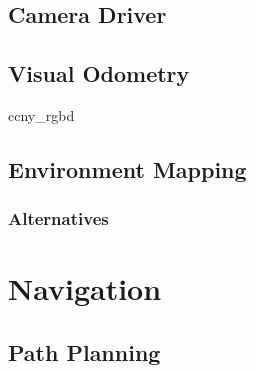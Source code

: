 \subsection{Camera Driver}
\subsection{Visual Odometry}
ccny\_rgbd \cite{ccny_rgbd}

\subsection{Environment Mapping}
\subsubsection{Alternatives}


\section{Navigation}

\subsection{Path Planning}
